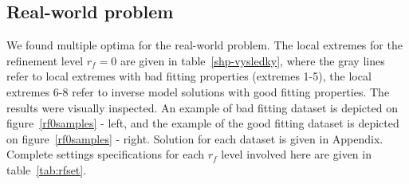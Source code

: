 \documentclass[review,times,3p,twocolumn,10pt]{elsarticle}
\begin{document}


\subsection{Real-world problem}

 We found multiple optima for the real-world problem. The local extremes for the refinement level $r_f=0$ are given in table~\ref{shp-vysledky}, where the gray lines refer to local extremes with bad fitting properties (extremes 1-5), the local extremes 6-8 refer to inverse model solutions with good fitting properties. The results were visually inspected. An example of bad fitting dataset is depicted on figure~\ref{rf0samples} - left, and the example of the good fitting dataset is depicted on figure~\ref{rf0samples} - right. Solution for each dataset is  given in Appendix. Complete settings specifications for each $r_f$ level involved here are given in table~\ref{tab:rfset}.
\end{document}
